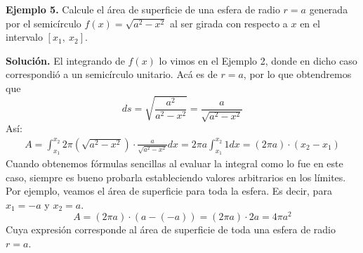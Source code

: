 \documentclass[12pt]{article}
\begin{document}
\textbf{Ejemplo 5.} Calcule el área de superficie de una esfera de radio $r = a$ generada por el semicírculo $f(x) = \sqrt{a^{2} - x^{2}}$ al ser girada con respecto a $x$ en el intervalo $[x_{1}, \ x_{2}]$.

\textbf{Solución.} El integrando de $f(x)$ lo vimos en el Ejemplo 2, donde en dicho caso correspondió a un semicírculo unitario. Acá es de $r = a$, por lo que obtendremos que
\[
  ds = \sqrt{\frac{a^{2}}{a^{2} - x^{2}}} = \frac{a}{\sqrt{a^{2} - x^{2}}}
\]
Así:
\begin{align*}
  A = \int_{x_{1}}^{x_{2}} 2 \pi \left(\sqrt{a^{2} - x^{2}}\right) \cdot \frac{a}{\sqrt{a^{2} - x^{2}}} dx
    = 2 \pi a \int_{x_{1}}^{x_{2}} 1 dx 
    = (2 \pi a) \cdot (x_{2} - x_{1})
\end{align*}
Cuando obtenemos fórmulas sencillas al evaluar la integral como lo fue en este caso, siempre es bueno probarla estableciendo valores arbitrarios en los límites. Por ejemplo, veamos el área de superficie para toda la esfera. Es decir, para $x_{1} = -a$ y $x_{2} = a$.
\[
  A = (2 \pi a) \cdot (a - (-a)) = (2 \pi a) \cdot 2a = 4 \pi a^{2}
\]
Cuya expresión corresponde al área de superficie de toda una esfera de radio $r = a$.
\end{document}
